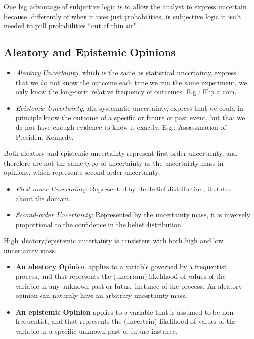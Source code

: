 \documentclass[a4paper,12pt]{article}
\theoremstyle{definition}
\numberwithin{equation}{section}
\begin{document}
One big advantage of subjective logic is to allow the analyst to express uncertain because, differently of when it uses just probabilities, in subjective logic it isn't needed to pull probabilities ``out of thin air".

\subsection{Aleatory and Epistemic Opinions}

\begin{itemize}
	\item \emph{Aleatory Uncertainty}, which is the same as statistical uncertainty, express that we do not know the outcome each time we run the same experiment, we only know the long-term relative frequency of outcomes. E.g.: Flip a coin.
	\item \emph{Epistemic Uncertainty}, aka systematic uncertainty, express that we could in principle know the outcome of a specific or future or past event, but that we do not have enough evidence to know it exactly. E.g.: Assassination of President Kennedy.
\end{itemize}

Both aleatory and epistemic uncertainty represent first-order uncertainty, and therefore are not the same type of uncertainty as the uncertainty mass in
opinions, which represents second-order uncertainty.

\begin{itemize}
	\item \emph{First-order Uncertainty}: Represented by the belief distribution, it states about the domain.
	\item \emph{Second-order Uncertainty}: Represented by the uncertainty mass, it is inversely proportional to the confidence in the belief distribution.
\end{itemize}

High aleatory/epistemic uncertainty is consistent with both high and low uncertainty mass.

\begin{itemize}
	\item \textbf{An aleatory Opinion} applies to a variable governed by a frequentist process, and that represents the (uncertain) likelihood of values of the variable in any unknown past or future instance of the process. An aleatory opinion can naturaly have an arbitrary uncertainty mass.
	\item \textbf{An epistemic Opinion} applies to a variable that is assumed to be non-frequentist,
and that represents the (uncertain) likelihood of values of the variable in a specific unknown past or future instance.
\end{itemize}
\end{document}
